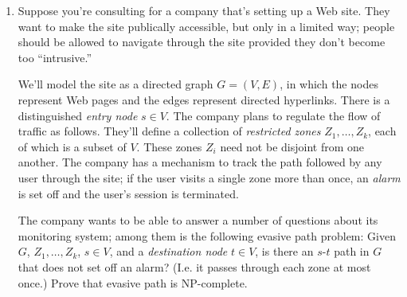 \documentclass[12pt]{article}
\begin{document}
\begin{enumerate}

\item 

Suppose you're consulting for a company
that's setting up a Web site.
They want to make the site publically accessible, but only
in a limited way; people should be allowed to
navigate through the site provided they don't
become too ``intrusive.''

We'll model the site as a directed graph $G = (V,E)$,
in which the nodes represent Web pages and
the edges represent directed hyperlinks.
There is a distinguished {\em entry node} $s \in V$.
The company plans to regulate the flow of traffic as follows.
They'll define a collection of {\em restricted zones}
$Z_1, \ldots, Z_k$, each of which is a subset of $V$.
These zones $Z_i$ need not be disjoint from one another.
The company has a mechanism to track the path followed by
any user through the site; if the user visits
a single zone more than once, an {\em alarm} is
set off and the user's session is terminated.

The company wants to be able to answer a number
of questions about its monitoring system;
among them is the following {\sc evasive path} problem:
Given $G$, $Z_1, \ldots, Z_k$, $s \in V$, and
a {\em destination node} $t \in V$,
is there an $s$-$t$ path in $G$ that does not
set off an alarm?  (I.e. it passes through each
zone at most once.)
Prove that {\sc evasive path} is NP-complete.

\end{enumerate}
\end{document}

